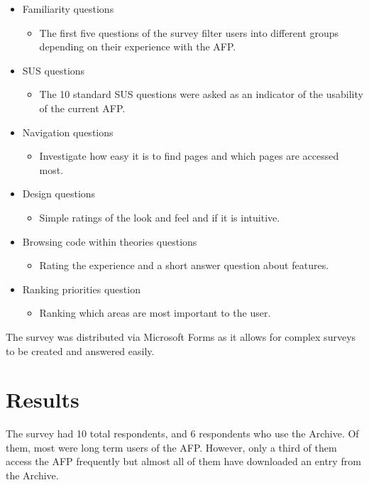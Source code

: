\documentclass[bsc,frontabs,oneside,singlespacing,parskip,deptreport,logo]{infthesis}
\begin{document}
\begin{itemize}
  \item Familiarity questions
  \begin{itemize}
    \item The first five questions of the survey filter users into different groups depending on their experience with the AFP\@.
  \end{itemize}
  \item SUS questions
  \begin{itemize}
    \item The 10 standard SUS questions were asked as an indicator of the usability of the current AFP\@. 
  \end{itemize}
  \item Navigation questions
  \begin{itemize}
    \item Investigate how easy it is to find pages and which pages are accessed most.
  \end{itemize}
  \item Design questions
  \begin{itemize}
    \item Simple ratings of the look and feel and if it is intuitive.
  \end{itemize}
  \item Browsing code within theories questions
  \begin{itemize}
    \item Rating the experience and a short answer question about features.
  \end{itemize}
  \item Ranking priorities question
  \begin{itemize}
    \item Ranking which areas are most important to the user.
  \end{itemize}
\end{itemize}

The survey was distributed via Microsoft Forms as it allows for complex surveys to be created and answered easily.

\section{Results}

The survey had 10 total respondents, and 6 respondents who use the Archive. Of them, most were long term users of the AFP\@. However, only a third of them access the AFP frequently but almost all of them have downloaded an entry from the Archive.
\end{document}

